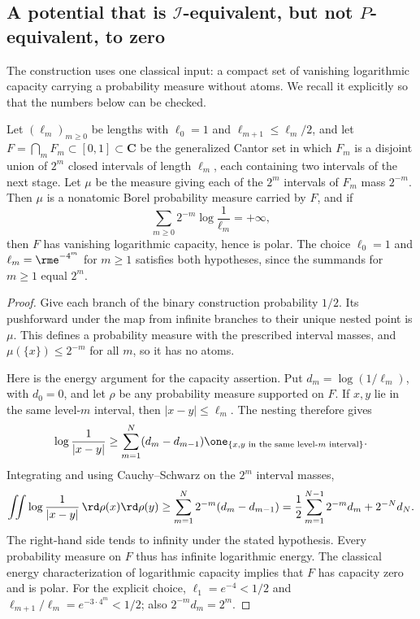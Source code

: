 \subsection{A potential that is
\texorpdfstring{$\mathcal I$}{I}-equivalent, but not
\texorpdfstring{$P$}{P}-equivalent, to zero}
\label{sec:ch51-cantor}

The construction uses one classical input: a compact set of vanishing
logarithmic capacity carrying a probability measure without atoms.  We
recall it explicitly so that the numbers below can be checked.

\begin{lemma}\label{lem:ch51-polar-cantor}
Let $(\ell_m)_{m\geq0}$ be lengths with $\ell_0=1$ and
$\ell_{m+1}\leq\ell_m/2$, and let
$F=\bigcap_mF_m\subset[0,1]\subset\mathbf C$ be the generalized Cantor
set in which $F_m$ is a disjoint union of $2^m$ closed intervals of
length $\ell_m$, each containing two intervals of the next stage.  Let
$\mu$ be the measure giving each of the $2^m$ intervals of $F_m$
mass $2^{-m}$.  Then $\mu$ is a nonatomic Borel probability measure
carried by $F$, and if
\[
 \sum_{m\geq0}2^{-m}\log\frac{1}{\ell_m}=+\infty ,
\]
then $F$ has vanishing logarithmic capacity, hence is polar.  The
choice $\ell_0=1$ and $\ell_m=\rme^{-4^m}$ for $m\geq1$
satisfies both hypotheses, since the summands for $m\geq1$ equal $2^m$.
\end{lemma}

\begin{proof}
Give each branch of the binary construction probability $1/2$.  Its
pushforward under the map from infinite branches to their unique nested
point is $\mu$.  This defines a probability measure with the prescribed
interval masses, and $\mu(\{x\})\leq2^{-m}$ for all $m$, so it has no
atoms.

Here is the energy argument for the capacity assertion.  Put
$d_m=\log(1/\ell_m)$, with $d_0=0$, and let $\rho$ be any probability
measure supported on $F$.  If $x,y$ lie in the same level-$m$ interval,
then $|x-y|\leq\ell_m$.  The nesting therefore gives
\[
 \log\frac1{|x-y|}\geq
 \sum_{m=1}^N(d_m-d_{m-1})
       \one_{\{x,y\text{ in the same level-}m\text{ interval}\}}.
\]
Integrating and using Cauchy--Schwarz on the $2^m$ interval masses,
\[
 \iint\log\frac1{|x-y|}\,\rd\rho(x)\rd\rho(y)
 \geq\sum_{m=1}^N2^{-m}(d_m-d_{m-1})
 =\frac12\sum_{m=1}^{N-1}2^{-m}d_m+2^{-N}d_N.
\]
The right-hand side tends to infinity under the stated hypothesis.
Every probability measure on $F$ thus has infinite logarithmic energy.
The classical energy characterization of logarithmic capacity
\cite{Car83} implies that $F$ has capacity zero and is polar.
For the explicit choice, $\ell_1=e^{-4}<1/2$ and
$\ell_{m+1}/\ell_m=e^{-3\cdot4^m}<1/2$; also $2^{-m}d_m=2^m$.
\end{proof}

